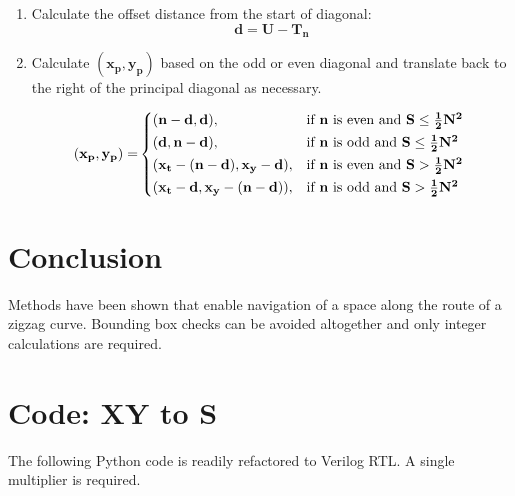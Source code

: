 \documentclass[10pt]{article}
\theoremstyle{theorem}
\begin{document}
\begin{enumerate}
  \item Calculate the offset distance from the start of diagonal:
    \[ \mathbf{d = U - T_n} \]

  \item Calculate $\mathbf{(x_p, y_p)}$ based on the odd or even diagonal and
    translate back to the right of the principal diagonal as necessary.

    \begin{align}
      \mathbf{(x_p, y_p) =}
      \begin{cases*}
      \mathbf{(n-d, d)}, & if $\mathbf{n}$ is even and $\mathbf{S \leq \frac{1}{2} N^2}$ \\
      \mathbf{(d, n-d)}, & if $\mathbf{n}$ is odd and $\mathbf{S \leq \frac{1}{2} N^2}$ \\
      \mathbf{(x_t-(n-d), x_y-d)}, & if $\mathbf{n}$ is even and $\mathbf{S > \frac{1}{2} N^2}$ \\
      \mathbf{(x_t-d, x_y-(n-d))}, & if $\mathbf{n}$ is odd and $\mathbf{S > \frac{1}{2} N^2}$ \\
      \end{cases*} \notag
    \end{align}

\end{enumerate}


\section{Conclusion}
Methods have been shown that enable navigation of a space along the route of a
zigzag curve. Bounding box checks can be avoided altogether and only integer
calculations are required.


\section{Code: XY to S}

The following Python code is readily refactored to Verilog RTL. A single
multiplier is required.
\end{document}

